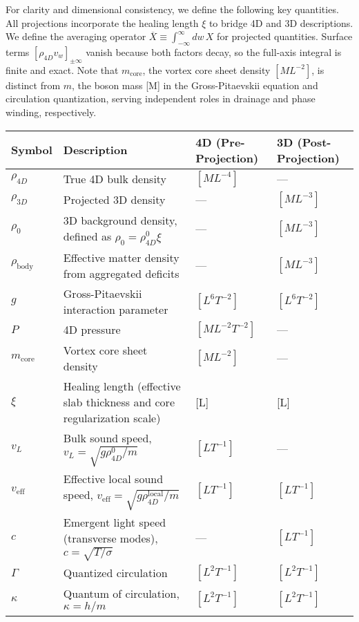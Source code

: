 For clarity and dimensional consistency, we define the following key quantities. All projections incorporate the healing length $\xi$ to bridge 4D and 3D descriptions. We define the averaging operator $\overline{X} \equiv \int_{-\infty}^{\infty} dw \, X$ for projected quantities. Surface terms $[\rho_{4D} v_w]_{\pm \infty}$ vanish because both factors decay, so the full-axis integral is finite and exact. Note that $m_{\text{core}}$, the vortex core sheet density $[M L^{-2}]$, is distinct from $m$, the boson mass [M] in the Gross-Pitaevskii equation and circulation quantization, serving independent roles in drainage and phase winding, respectively.

\begin{table}[H]
\centering
\begin{tabularx}{\textwidth}{|l|Y|l|l|}
\hline
Symbol & Description & 4D (Pre-Projection) & 3D (Post-Projection) \\
\hline
$\rho_{4D}$ & True 4D bulk density & $[M L^{-4}]$ & --- \\
\hline
$\rho_{3D}$ & Projected 3D density & --- & $[M L^{-3}]$ \\
\hline
$\rho_0$ & 3D background density, defined as $\rho_0 = \rho_{4D}^0 \xi$ & --- & $[M L^{-3}]$ \\
\hline
$\rho_{\text{body}}$ & Effective matter density from aggregated deficits & --- & $[M L^{-3}]$ \\
\hline
$g$ & Gross-Pitaevskii interaction parameter & $[L^6 T^{-2}]$ & $[L^6 T^{-2}]$ \\
\hline
$P$ & 4D pressure & $[M L^{-2} T^{-2}]$ & --- \\
\hline
$m_{\text{core}}$ & Vortex core sheet density & $[M L^{-2}]$ & --- \\
\hline
$\xi$ & Healing length (effective slab thickness and core regularization scale) & [L] & [L] \\
\hline
$v_L$ & Bulk sound speed, $v_L = \sqrt{g \rho_{4D}^0 / m}$ & $[L T^{-1}]$ & --- \\
\hline
$v_{\text{eff}}$ & Effective local sound speed, $v_{\text{eff}} = \sqrt{g \rho_{4D}^{\text{local}} / m}$ & $[L T^{-1}]$ & $[L T^{-1}]$ \\
\hline
$c$ & Emergent light speed (transverse modes), $c = \sqrt{T / \sigma}$ & --- & $[L T^{-1}]$ \\
\hline
$\Gamma$ & Quantized circulation & $[L^2 T^{-1}]$ & $[L^2 T^{-1}]$ \\
\hline
$\kappa$ & Quantum of circulation, $\kappa = h / m$ & $[L^2 T^{-1}]$ & $[L^2 T^{-1}]$ \\

\end{tabularx}
\end{table}
